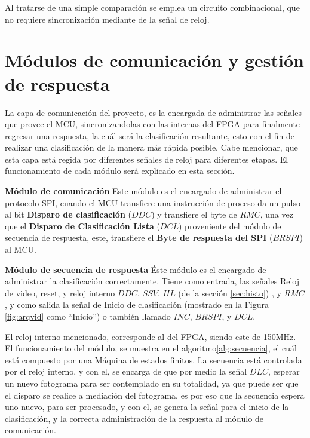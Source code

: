 \documentclass[twoside,spanish,ESP,MSc]{plantillaLabUPV}
\theoremstyle{definition}
\begin{document}
Al tratarse de una simple comparación se emplea un circuito combinacional, que no requiere sincronización mediante de la señal de reloj.


\section{Módulos de comunicación y gestión de respuesta} \label{sec:comm}
La capa de comunicación del proyecto, es la encargada de administrar las señales que provee el MCU, sincronizandolas con las internas del FPGA para finalmente regresar una respuesta, la cuál será la clasificación resultante, esto con el fin de realizar una clasificación de la manera más rápida posible. Cabe mencionar, que esta capa está regida por diferentes señales de reloj para diferentes etapas. El funcionamiento de cada módulo será explicado en esta sección.

\checkmark\textbf{Módulo de comunicación}
Este módulo es el encargado de administrar el protocolo SPI, cuando el MCU transfiere una instrucción de proceso da un pulso al bit \textbf{Disparo de clasificación} ($DDC$) y transfiere el byte de $RMC$, una vez que el \textbf{Disparo de Clasificación Lista} ($DCL$) proveniente del módulo de secuencia de respuesta, este, transfiere el \textbf{Byte de respuesta del SPI} ($BRSPI$) al MCU.

\checkmark\textbf{Módulo de secuencia de respuesta}
Éste módulo es el encargado de administrar la clasificación correctamente. Tiene como entrada, las señales Reloj de video, reset, y reloj interno $DDC$, $SSV$, $HL$ (de la sección \ref{sec:histo}) , y $RMC$ , y como salida la señal de Inicio de clasificación (mostrado en la Figura \ref{fig:arqvid} como ``Inicio'') o también llamado $INC$, $BRSPI$, y $DCL$. 

El reloj interno mencionado, corresponde al del FPGA, siendo este de 150MHz. El funcionamiento del módulo, se muestra en el algoritmo\ref{alg:secuencia}, el cuál está compuesto por una Máquina de estados finitos. La secuencia está controlada por el reloj interno, y con el, se encarga de que por medio la señal $DLC$, esperar un nuevo fotograma para ser contemplado en su totalidad, ya que puede ser que el disparo se realice a mediación del fotograma, es por eso que la secuencia espera uno nuevo, para ser procesado, y con el, se genera la señal para el inicio de la clasificación, y la correcta administración de la respuesta al módulo de comunicación.  
\end{document}
